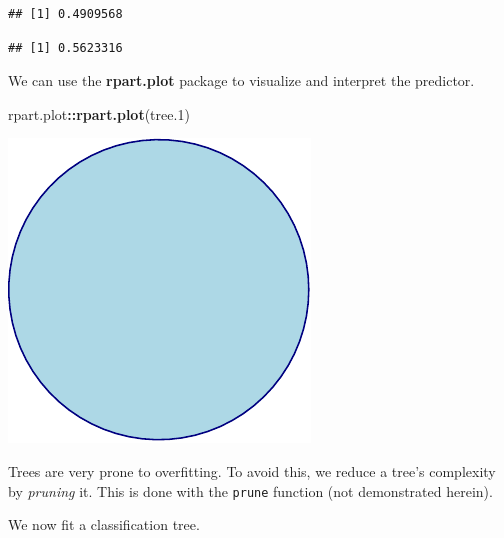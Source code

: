 \documentclass[]{book}
\newenvironment{Shaded}{\begin{snugshade}}{\end{snugshade}}
\newcommand{\KeywordTok}[1]{\textcolor[rgb]{0.13,0.29,0.53}{\textbf{#1}}}
\newcommand{\DataTypeTok}[1]{\textcolor[rgb]{0.13,0.29,0.53}{#1}}
\newcommand{\DecValTok}[1]{\textcolor[rgb]{0.00,0.00,0.81}{#1}}
\newcommand{\StringTok}[1]{\textcolor[rgb]{0.31,0.60,0.02}{#1}}
\newcommand{\CommentTok}[1]{\textcolor[rgb]{0.56,0.35,0.01}{\textit{#1}}}
\newcommand{\OperatorTok}[1]{\textcolor[rgb]{0.81,0.36,0.00}{\textbf{#1}}}
\newcommand{\NormalTok}[1]{#1}
\theoremstyle{definition}
\theoremstyle{definition}
\theoremstyle{definition}
\theoremstyle{remark}
\begin{document}
\begin{verbatim}
## [1] 0.4909568
\end{verbatim}

\begin{Shaded}
\end{Shaded}

\begin{verbatim}
## [1] 0.5623316
\end{verbatim}

We can use the \textbf{rpart.plot} package to visualize and interpret
the predictor.

\begin{Shaded}
\begin{Highlighting}[]
\NormalTok{rpart.plot}\OperatorTok{::}\KeywordTok{rpart.plot}\NormalTok{(tree.}\DecValTok{1}\NormalTok{)}
\end{Highlighting}
\end{Shaded}

\includegraphics[width=0.5\linewidth]{Rcourse_files/figure-latex/unnamed-chunk-226-1}

Trees are very prone to overfitting. To avoid this, we reduce a tree's
complexity by \emph{pruning} it. This is done with the \texttt{prune}
function (not demonstrated herein).

We now fit a classification tree.

\begin{Shaded}
\end{Shaded}
\end{document}
